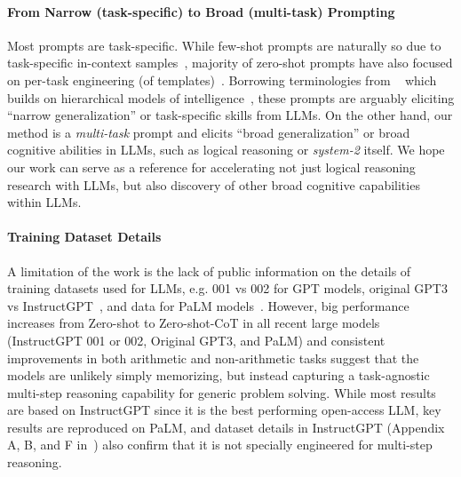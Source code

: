 \documentclass{article}
\newcommand{\ours}{Zero-shot-CoT\xspace}
\newcommand{\theirsz}{Zero-shot\xspace}
\begin{document}
\paragraph{From Narrow (task-specific) to Broad (multi-task) Prompting}
Most prompts are task-specific. While few-shot prompts are naturally so due to task-specific in-context samples~\citep{brown2020language,cot_wei}, majority of zero-shot prompts have also focused on per-task engineering (of templates)~\citep{liu2021pre,prompt1}. Borrowing terminologies from ~\citet{chollet2019measure} which builds on hierarchical models of intelligence~\citep{mcgrew2005cattell,johnson2005structure}, these prompts are arguably eliciting ``narrow generalization'' or task-specific skills from LLMs. On the other hand, our method is a \textit{multi-task} prompt and elicits ``broad generalization'' or broad cognitive abilities in LLMs, such as logical reasoning or \textit{system-2} itself. We hope our work can serve as a reference for accelerating not just logical reasoning research with LLMs, but also discovery of other broad cognitive capabilities within LLMs. 



\paragraph{Training Dataset Details}
\label{appx:limitation_dataset}
A limitation of the work is the lack of public information on the details of training datasets used for LLMs, e.g. 001 vs 002 for GPT models, original GPT3 vs InstructGPT~\citep{instructgpt}, and data for PaLM models~\citep{palm}. However, big performance increases from \theirsz to \ours in all recent large models (InstructGPT 001 or 002, Original GPT3, and PaLM) and consistent improvements in both arithmetic and non-arithmetic tasks suggest that the models are unlikely simply memorizing, but instead capturing a task-agnostic multi-step reasoning capability for generic problem solving. While most results are based on InstructGPT since it is the best performing open-access LLM, key results are reproduced on PaLM, and dataset details in InstructGPT (Appendix A, B, and F in~\citet{instructgpt}) also confirm that it is not specially engineered for multi-step reasoning. 
\end{document}
